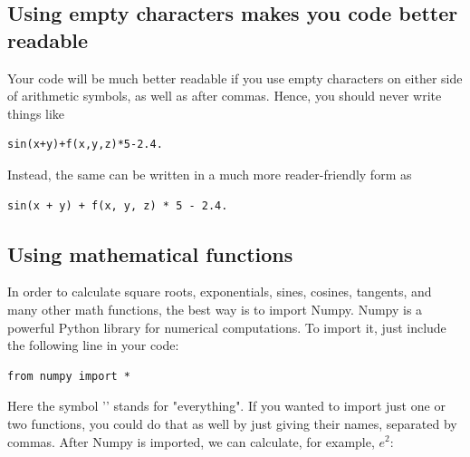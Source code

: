 \documentclass[article,A4,12pt]{llncs}
\begin{document}
\subsection{Using empty characters makes you code better readable}
Your code will be much better readable if you use empty
characters on either side of arithmetic symbols, as well as 
after commas. Hence, you should never write things like \\

\begin{bbox}
\begin{verbatim}
sin(x+y)+f(x,y,z)*5-2.4.
\end{verbatim}
\end{bbox}
\vspace{6mm}

\noindent
Instead, the same can be written in a much more reader-friendly form as\\

\begin{bbox}
\begin{verbatim}
sin(x + y) + f(x, y, z) * 5 - 2.4.
\end{verbatim}
\end{bbox}
\vspace{6mm}

\noindent

\subsection{Using mathematical functions}

In order to calculate square roots, exponentials, sines, cosines, tangents, and many other 
math functions, the best way is to import Numpy. Numpy is a powerful Python library 
for numerical computations. To import it, just include the following 
line in your code:\\

\begin{bbox}
\begin{verbatim}
from numpy import *
\end{verbatim}
\end{bbox}
\vspace{6mm}

\noindent
Here the symbol '{\tt *}' stands for "everything". If you wanted to import just one or two 
functions, you could do that as well by just giving their names, separated by commas. 
After Numpy is imported, we can calculate, for example, $e^2$:\\
\end{document}
